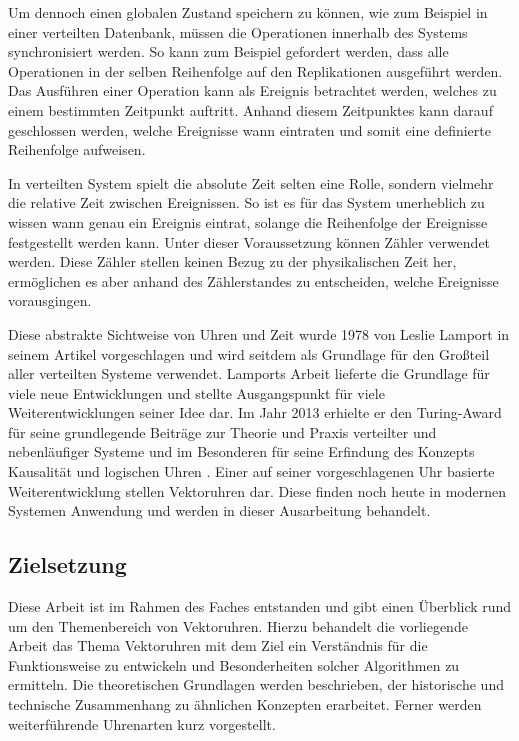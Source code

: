 Um dennoch einen globalen Zustand speichern zu können, wie zum Beispiel in einer verteilten Datenbank, müssen die Operationen innerhalb des Systems synchronisiert werden. So kann zum Beispiel gefordert werden, dass alle Operationen in der selben Reihenfolge auf den Replikationen ausgeführt werden.
Das Ausführen einer Operation kann als Ereignis betrachtet werden, welches zu einem bestimmten Zeitpunkt auftritt.
Anhand diesem Zeitpunktes kann darauf geschlossen werden, welche Ereignisse wann eintraten und somit eine definierte Reihenfolge aufweisen.

In verteilten System spielt die absolute Zeit selten eine Rolle, sondern vielmehr die relative Zeit zwischen Ereignissen.
So ist es für das System unerheblich zu wissen wann genau ein Ereignis eintrat, solange die Reihenfolge der Ereignisse festgestellt werden kann. Unter dieser Voraussetzung können Zähler verwendet werden. Diese Zähler stellen keinen Bezug zu der physikalischen Zeit her, ermöglichen es aber anhand des Zählerstandes zu entscheiden, welche Ereignisse vorausgingen.

Diese abstrakte Sichtweise von Uhren und Zeit wurde 1978 von Leslie Lamport in seinem Artikel  vorgeschlagen und wird seitdem als Grundlage für den Großteil aller verteilten Systeme verwendet.
Lamports Arbeit lieferte die Grundlage für viele neue Entwicklungen und stellte Ausgangspunkt für viele Weiterentwicklungen seiner Idee dar.
Im Jahr 2013 erhielte er den Turing-Award für seine grundlegende Beiträge zur Theorie und Praxis verteilter und nebenläufiger Systeme und im Besonderen für seine Erfindung des Konzepts Kausalität und logischen Uhren \cite{acm2013turing}.
Einer auf seiner vorgeschlagenen Uhr basierte Weiterentwicklung stellen Vektoruhren dar.
Diese finden noch heute in modernen Systemen Anwendung und werden in dieser Ausarbeitung behandelt.

\subsection{Zielsetzung}
Diese Arbeit ist im Rahmen des Faches  entstanden und gibt einen Überblick rund um den Themenbereich von Vektoruhren.
Hierzu behandelt die vorliegende Arbeit das Thema Vektoruhren mit dem Ziel ein Verständnis für die Funktionsweise zu entwickeln und Besonderheiten solcher Algorithmen zu ermitteln.
Die theoretischen Grundlagen werden beschrieben, der historische und technische Zusammenhang zu ähnlichen Konzepten erarbeitet.
Ferner werden weiterführende Uhrenarten kurz vorgestellt.


